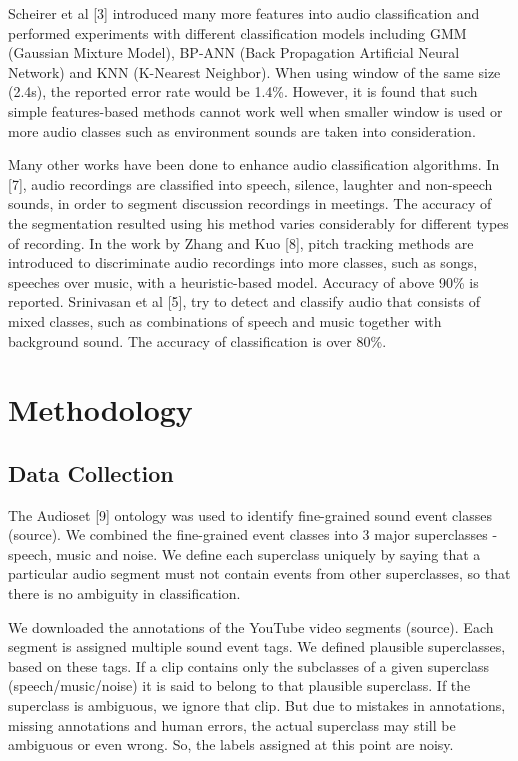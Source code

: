 \documentclass{article}
\begin{document}
Scheirer et al [3] introduced many more features into audio classification and performed experiments with different classification models including GMM (Gaussian Mixture Model), BP-ANN (Back Propagation Artificial Neural Network) and KNN (K-Nearest Neighbor). When using window of the same size (2.4s), the reported error rate would be 1.4\%. However, it is found that such simple features-based methods cannot work well when smaller window is used or more audio classes such as environment sounds are taken into consideration.  

Many other works have been done to enhance audio classification algorithms. In [7], audio recordings are classified into speech, silence, laughter and non-speech sounds, in order to segment discussion recordings in meetings. The accuracy of the segmentation resulted using his method varies considerably for different types of recording. In the work by Zhang and Kuo [8], pitch tracking methods are introduced to discriminate audio recordings into more classes, such as songs, speeches over music, with a heuristic-based model. Accuracy of above 90\% is reported. Srinivasan et al [5], try to detect and classify audio that consists of mixed classes, such as combinations of speech and music together with background sound. The accuracy of classification is over 80\%. 

\section{Methodology}

\subsection{Data Collection}
The Audioset [9] ontology was used to identify fine-grained sound event classes (source). We combined the fine-grained event classes into 3 major superclasses - speech, music and noise. We define each superclass uniquely by saying that a particular audio segment must not contain events from other superclasses, so that there is no ambiguity in classification. 

We downloaded the annotations of the YouTube video segments (source). Each segment is assigned multiple sound event tags. We defined plausible superclasses, based on these tags. If a clip contains only the subclasses of a given superclass (speech/music/noise) it is said to belong to that plausible superclass. If the superclass is ambiguous, we ignore that clip. But due to mistakes in annotations, missing annotations and human errors, the actual superclass may still be ambiguous or even wrong. So, the labels assigned at this point are noisy. 
\end{document}
